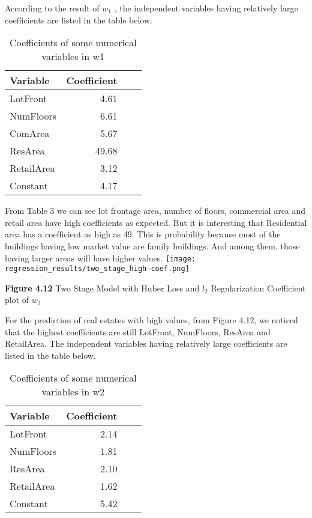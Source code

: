 \documentclass[9pt,twocolumn,twoside]{pnas-new}
\begin{document}
\noindent According to the result of $w_1$ , the independent variables having relatively large coefficients are listed in the table below.

\begin{table}[H]
\begin{tabular}{lrrr}
Variable & Coefficient\\
\midrule
LotFront & 4.61 \\
NumFloors & 6.61 \\
ComArea & 5.67\\
ResArea & 49.68 \\
RetailArea & 3.12 \\
Constant & 4.17\\
\bottomrule
\end{tabular}
\centering
\caption{Coefficients of some numerical variables in w1}
\end{table}

\noindent From {Table 3} we can see lot frontage area, number of floors, commercial area and retail area have high coefficients as expected. But it is interesting that Residential area has a coefficient as high as 49. This is probability because most of the buildings having low market value are family buildings. And among them, those having larger areas will have higher values.
\texttt{[image: regression\_results/two\_stage\_high-coef.png]} 
\begin{center}
\textbf{Figure 4.12} Two Stage Model with Huber Loss and $l_{2}$ Regularization Coefficient plot of $w_2$
\end{center}

\noindent For the prediction of real estates with high values, from {Figure 4.12}, we noticed that the highest coefficients are still LotFront, NumFloors, ResArea and RetailArea. The independent variables having relatively large coefficients are listed in the table below.

\begin{table}[H]
\begin{tabular}{lrrr}
Variable & Coefficient\\
\midrule
LotFront & 2.14 \\
NumFloors & 1.81 \\
ResArea & 2.10 \\
RetailArea & 1.62 \\
Constant & 5.42\\
\bottomrule
\end{tabular}
\centering
\caption{Coefficients of some numerical variables in w2}
\end{table}
\end{document}
